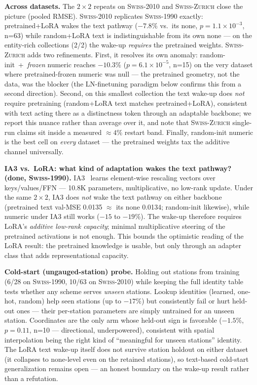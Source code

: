 \documentclass[sigconf,review]{acmart}
\newcommand{\swiss}{\textsc{Swiss-1990}}
\newcommand{\swissb}{\textsc{Swiss-2010}}
\newcommand{\swissc}{\textsc{Swiss-Zurich}}
\begin{document}
\textbf{Across datasets.} The $2{\times}2$ repeats on \swissb{} and \swissc{}
close the picture (pooled RMSE). \swissb{} replicates \swiss{} exactly:
pretrained{+}LoRA wakes the text pathway ($-7.8\%$ vs.\ its \textsf{none},
$p{=}1.1{\times}10^{-3}$, n=63) while random{+}LoRA text is indistinguishable
from its own \textsf{none} --- on the entity-rich collections (2/2) the wake-up
\emph{requires} the pretrained weights. \swissc{} adds two refinements. First,
it resolves its own anomaly: random-init~+~\emph{frozen} numeric reaches
$-10.3\%$ ($p{=}6.1{\times}10^{-5}$, n=15) on the very dataset where
pretrained-frozen numeric was null --- the pretrained geometry, not the data,
was the blocker (the LN-finetuning paradigm below confirms this from a second
direction). Second, on this smallest collection the text wake-up does \emph{not}
require pretraining (random{+}LoRA text matches pretrained{+}LoRA), consistent
with text acting there as a distinctness token through an adaptable backbone; we
report this nuance rather than average over it, and note that \swissc{}
single-run claims sit inside a measured ${\approx}4\%$ restart band. Finally,
random-init numeric is the best cell on \emph{every} dataset --- the pretrained
weights tax the additive channel universally.

\textbf{IA3 vs.\ LoRA: what kind of adaptation wakes the text pathway? (done,
\swiss{}).} IA3~\cite{liu2022ia3} learns element-wise rescaling vectors over
keys/values/FFN --- 10.8K parameters, multiplicative, no low-rank update. Under
the same $2{\times}2$, IA3 does \emph{not} wake the text pathway on either
backbone (pretrained text val-MSE 0.0135 ${\approx}$ its \textsf{none} 0.0134;
random-init likewise), while \textsf{numeric} under IA3 still works ($-15$ to
$-19\%$). The wake-up therefore requires LoRA's \emph{additive low-rank
capacity}; minimal multiplicative steering of the pretrained activations is not
enough. This bounds the optimistic reading of the LoRA result: the pretrained
knowledge is usable, but only through an adapter class that adds representational
capacity.

\textbf{Cold-start (ungauged-station) probe.} Holding out stations from training
(6/28 on \swiss{}, 10/63 on \swissb{}) while keeping the full identity table
tests whether any scheme serves \emph{unseen} stations. Lookup identities
(learned, one-hot, random) help seen stations (up to $-17\%$) but consistently
fail or hurt held-out ones --- their per-station parameters are simply untrained
for an unseen station. Coordinates are the only arm whose held-out sign is
favorable ($-1.5\%$, $p{=}0.11$, n=10 --- directional, underpowered), consistent
with spatial interpolation being the right kind of ``meaningful for unseen
stations'' identity. The LoRA text wake-up itself does not survive station
holdout on either dataset (it collapses to \textsf{none}-level even on the
retained stations), so text-based cold-start generalization remains open ---
an honest boundary on the wake-up result rather than a refutation.
\end{document}

